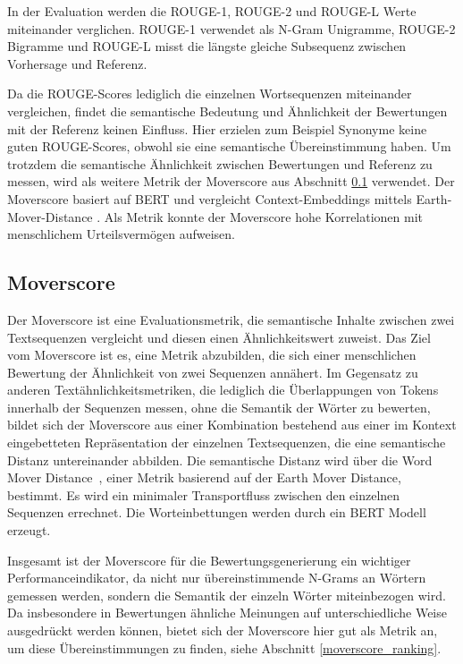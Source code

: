 In der Evaluation werden die ROUGE-1, ROUGE-2 und ROUGE-L Werte miteinander verglichen.
ROUGE-1 verwendet als N-Gram Unigramme, ROUGE-2 Bigramme und ROUGE-L misst die längste gleiche Subsequenz zwischen Vorhersage und Referenz.

Da die ROUGE-Scores lediglich die einzelnen Wortsequenzen miteinander vergleichen, findet die semantische Bedeutung und Ähnlichkeit der Bewertungen mit der Referenz keinen Einfluss.
Hier erzielen zum Beispiel Synonyme keine guten ROUGE-Scores, obwohl sie eine semantische Übereinstimmung haben.
Um trotzdem die semantische Ähnlichkeit zwischen Bewertungen und Referenz zu messen, wird als weitere Metrik der Moverscore aus Abschnitt \ref{moverscore} verwendet.
Der Moverscore basiert auf BERT und vergleicht Context-Embeddings mittels Earth-Mover-Distance \citep{emd}. Als Metrik konnte der Moverscore hohe Korrelationen mit menschlichem Urteilsvermögen aufweisen.


\subsection{Moverscore}
\label{moverscore}
Der Moverscore \citep{moverscore_paper} ist eine Evaluationsmetrik, die semantische Inhalte zwischen zwei Textsequenzen vergleicht und diesen einen Ähnlichkeitswert zuweist.
Das Ziel vom Moverscore ist es, eine Metrik abzubilden, die sich einer menschlichen Bewertung der Ähnlichkeit von zwei Sequenzen annähert. 
Im Gegensatz zu anderen Textähnlichkeitsmetriken, die lediglich die Überlappungen von Tokens innerhalb der Sequenzen messen, ohne die Semantik der Wörter zu bewerten, 
bildet sich der Moverscore aus einer Kombination bestehend aus einer im Kontext eingebetteten Repräsentation der einzelnen Textsequenzen, die eine semantische Distanz untereinander abbilden.
Die semantische Distanz wird über die Word Mover Distance \citep{wordmoverdistance}, einer Metrik basierend auf der Earth Mover Distance, bestimmt. Es wird ein minimaler Transportfluss zwischen den einzelnen Sequenzen errechnet.
Die Worteinbettungen werden durch ein BERT Modell erzeugt.

Insgesamt ist der Moverscore für die Bewertungsgenerierung ein wichtiger Performance\-indikator, da nicht nur übereinstimmende N-Grams an Wörtern gemessen werden, sondern die Semantik der einzeln Wörter miteinbezogen wird. 
Da insbesondere in Bewertungen ähnliche Meinungen auf unterschiedliche Weise ausgedrückt werden können, bietet sich der Moverscore hier gut als Metrik an, um diese Übereinstimmungen zu finden, siehe Abschnitt \ref{moverscore_ranking}.


